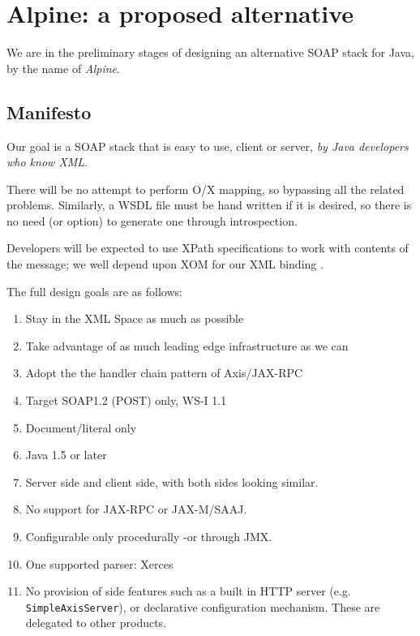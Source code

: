 \section{Alpine: a proposed alternative}

We are in the preliminary stages of designing an alternative SOAP
stack for Java, by the name of \emph{Alpine}.

\subsection{Manifesto}

Our goal is a SOAP stack that is easy to use, client or server, 
\emph{by Java developers who know XML}. 

There will be no attempt to perform O/X mapping, so bypassing all the
related problems. Similarly, a WSDL file must be hand written if it is
desired, so there is no need (or option) to generate one through
introspection.

Developers will be expected to use XPath specifications to work with
contents of the message; we well depend upon XOM for our XML binding
\cite{harold:xom}.

The full design goals are as follows:

\begin{enumerate}

\item Stay in the XML Space as much as possible
\item Take advantage of as much leading edge infrastructure as we can
\item Adopt the the handler chain pattern of Axis/JAX-RPC
\item Target SOAP1.2 (POST) only, WS-I 1.1
\item Document/literal only
\item Java 1.5 or later 
\item Server side and client side, with both sides looking similar. 
\item No support for JAX-RPC or JAX-M/SAAJ.
\item Configurable only procedurally -or through JMX. 
\item One supported parser: Xerces

\item No provision of side features such as a built in HTTP server (e.g.
\verb|SimpleAxisServer|), or declarative configuration mechanism.
These are delegated to other products.
\end{enumerate}

